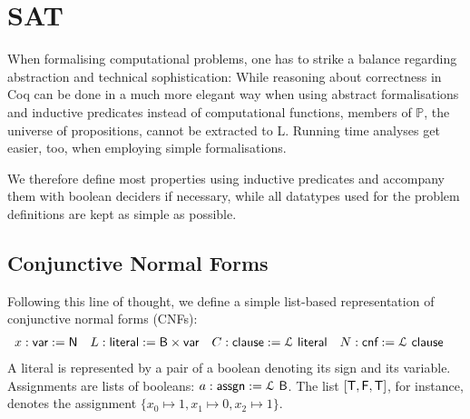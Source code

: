 \documentclass[a4paper,UKenglish,cleveref, autoref]{lipics-v2019}
\begin{document}
\section{SAT}
\newcommand{\var}{\textsf{var}}
\newcommand{\literal}{\textsf{literal}}
\newcommand{\clause}{\textsf{clause}}
\newcommand{\cnf}{\textsf{cnf}}
\newcommand{\assgn}{\textsf{assgn}}

\newcommand*{\eval}[2]{\mathcal{E}~#1~#2~}

When formalising computational problems, one has to strike a balance regarding abstraction and technical sophistication: While reasoning about correctness in Coq can be done in a much more elegant way when using abstract formalisations and inductive predicates instead of computational functions, members of $\mathbb{P}$, the universe of propositions, cannot be extracted to L. Running time analyses get easier, too, when employing simple formalisations. 

We therefore define most properties using inductive predicates and accompany them with boolean deciders if necessary, while all datatypes used for the problem definitions are kept as simple as possible.

\subsection{Conjunctive Normal Forms}
Following this line of thought, we define a simple list-based representation of conjunctive normal forms (CNFs):
\begin{align*}
  x : \var := \nat &&
  L : \literal := \bool \times \var &&
  C : \clause := \listsof \literal &&
  N : \cnf := \listsof \clause && 
\end{align*}
A literal is represented by a pair of a boolean denoting its sign and its variable. 
Assignments are lists of booleans: $a : \assgn := \listsof \bool$. The list $[\mathsf{T}, \mathsf{F}, \mathsf{T}]$, for instance, denotes the assignment $\{x_0 \mapsto 1, x_1 \mapsto 0, x_2 \mapsto 1\}$. 
  
\end{document}
